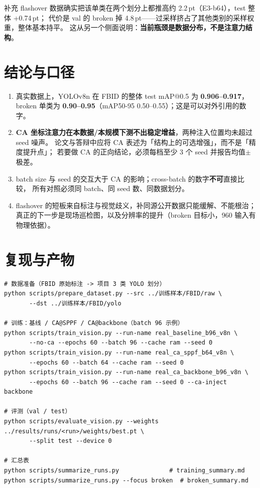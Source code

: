 \documentclass[UTF8,a4paper,11pt]{ctexart}
\begin{document}
补充 flashover 数据确实把该单类在两个划分上都推高约 2.2\,pt（E3-b64），test 整体 +0.74\,pt；
代价是 val 的 broken 掉 4.8\,pt——过采样挤占了其他类别的采样权重，整体基本持平。
这从另一个侧面说明：\textbf{当前瓶颈是数据分布，不是注意力结构}。

\section{结论与口径}

\begin{enumerate}[label=(\arabic*)]
  \item 真实数据上，YOLOv8n 在 FBID 的整体 test mAP@0.5 为 \textbf{0.906--0.917}，
        broken 单类为 \textbf{0.90--0.95}（mAP50-95 0.50--0.55）；这是可以对外引用的数字。
  \item \textbf{CA 坐标注意力在本数据/本规模下测不出稳定增益}，两种注入位置均未超过 seed 噪声。
        论文与答辩中应将 CA 表述为「结构上的可选增强」，而不是「精度提升点」；
        若要做 CA 的正向结论，必须每档至少 3 个 seed 并报告均值$\pm$极差。
  \item batch size 与 seed 的交互大于 CA 的影响；cross-batch 的数字\textbf{不可}直接比较，
        所有对照必须同 batch、同 seed 数、同数据划分。
  \item flashover 的短板来自标注与视觉歧义，补同源公开数据只能缓解、不能根治；
        真正的下一步是现场巡检图，以及分辨率的提升（broken 目标小，960 输入有物理依据）。
\end{enumerate}

\section{复现与产物}

\begin{verbatim}
# 数据准备（FBID 原始标注 -> 项目 3 类 YOLO 划分）
python scripts/prepare_dataset.py --src ../训练样本/FBID/raw \
       --dst ../训练样本/FBID/yolo

# 训练：基线 / CA@SPPF / CA@backbone（batch 96 示例）
python scripts/train_vision.py --run-name real_baseline_b96_v8n \
       --no-ca --epochs 60 --batch 96 --cache ram --seed 0
python scripts/train_vision.py --run-name real_ca_sppf_b64_v8n \
       --epochs 60 --batch 64 --cache ram --seed 0
python scripts/train_vision.py --run-name real_ca_backbone_b96_v8n \
       --epochs 60 --batch 96 --cache ram --seed 0 --ca-inject backbone

# 评测（val / test）
python scripts/evaluate_vision.py --weights ../results/runs/<run>/weights/best.pt \
       --split test --device 0

# 汇总表
python scripts/summarize_runs.py              # training_summary.md
python scripts/summarize_runs.py --focus broken  # broken_summary.md
\end{verbatim}
\end{document}
